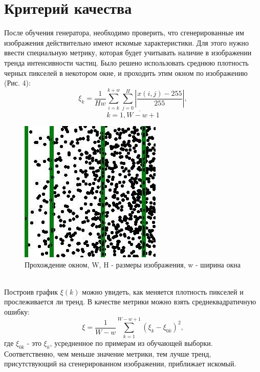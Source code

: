 \documentclass[a4paper]{article}
\begin{document}
	\section{Критерий качества}
		После обучения генератора, необходимо проверить, что сгенерированные им изображения действительно имеют искомые характеристики. Для этого нужно ввести специальную метрику, которая будет учитывать наличие в изображении тренда интенсивности частиц. Было решено использовать среднюю плотность черных пикселей в некотором окне, и проходить этим окном по изображению (Рис. 4):
		$$\xi_k = \frac{1}{H w}{\sum_{i=k}^{k+w} \sum_{j=0}^{H}\left| \frac{x(i, j) - 255}{255} \right|}, $$$$k = \overline{1, W - w + 1} $$
		\begin{figure}[h!]
			\begin{center}
				\includegraphics[width=0.35\linewidth]{metrics}
			\end{center}
			\caption{Прохождение окном, W, H - размеры изображения, w - ширина окна}
		\end{figure}
		\\
		Построив график $\xi(k)$ можно увидеть, как меняется плотность пикселей и прослеживается ли тренд. В качестве метрики можно взять среднеквадратичную ошибку:
		$$ \xi = \frac{1}{W-w}\sum_{k=1}^{W-w+1} (\xi_k - \xi_{0k})^2,$$
		где $\xi_{0k}$ - это $\xi_k$, усредненное по примерам из обучающей выборки. Соответственно, чем меньше значение метрики, тем лучше тренд, присутствующий на сгенерированном изображении, приближает искомый.
\end{document}
